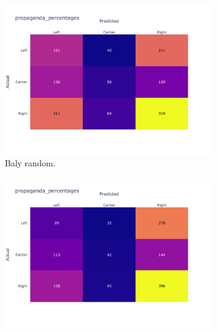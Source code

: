 \begin{figure}[!htbp]
    \centering
    \begin{subfigure}[b]{0.48\linewidth}
        \centering
        \includegraphics[width=\linewidth]{figures/baly_random_confusion_matrix_propaganda_percentages-small.pdf}
        \caption{Baly random.}
        \label{fig:prop_tech_confusion_baly_random}
    \end{subfigure}
    \begin{subfigure}[b]{0.48\linewidth}
        \centering
        \includegraphics[width=\linewidth]{figures/baly_media_confusion_matrix_propaganda_percentages-small.pdf}

\end{subfigure}
\end{figure}
